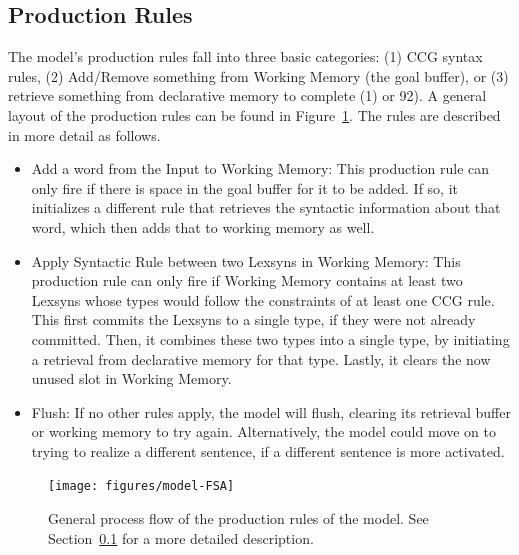 \subsection{Production Rules}\label{sec:rules}
The model's production rules fall into three basic categories: (1) CCG syntax rules, (2) Add/Remove something from Working Memory (the goal buffer), or (3) retrieve something from declarative memory to complete (1) or 92). A general layout of the production rules can be found in Figure~\ref{fig:prod}. The rules are described in more detail as follows.
\begin{itemize}
\item Add a word from the Input to Working Memory: This production rule can only fire if there is space in the goal buffer for it to be added. If so, it initializes a different rule that retrieves the syntactic information about that word, which then adds that to working memory as well.
\item Apply Syntactic Rule between two Lexsyns in Working Memory: This production rule can only fire if Working Memory contains at least two Lexsyns whose types would follow the constraints of at least one CCG rule. This first commits the Lexsyns to a single type, if they were not already committed. Then, it combines these two types into a single type, by initiating a retrieval from declarative memory for that type. Lastly, it clears the now unused slot in Working Memory.
\item Flush: If no other rules apply, the model will flush, clearing its retrieval buffer or working memory to try again. Alternatively, the model could move on to trying to realize a different sentence, if a different sentence is more activated. 
\end{itemize}

\begin{figure}[ht]
\begin{center}
\texttt{[image: figures/model-FSA]}
\end{center}
\caption{General process flow of the production rules of the model. See Section~\ref{sec:rules} for a more detailed description.}  
\label{fig:prod}
\end{figure}

